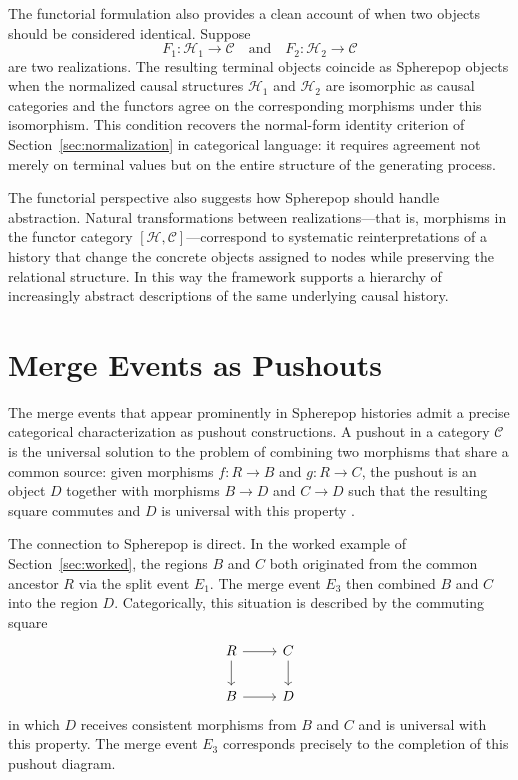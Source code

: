 \documentclass[12pt]{article}
\theoremstyle{plain}
\theoremstyle{definition}
\theoremstyle{remark}
\begin{document}
The functorial formulation also provides a clean account of when two objects
should be considered identical.  Suppose
\[
  F_1 : \mathcal{H}_1 \rightarrow \mathcal{C}
  \quad\text{and}\quad
  F_2 : \mathcal{H}_2 \rightarrow \mathcal{C}
\]
are two realizations.  The resulting terminal objects coincide as Spherepop
objects when the normalized causal structures $\mathcal{H}_1$ and $\mathcal{H}_2$
are isomorphic as causal categories and the functors agree on the corresponding
morphisms under this isomorphism.  This condition recovers the normal-form
identity criterion of Section~\ref{sec:normalization} in categorical language:
it requires agreement not merely on terminal values but on the entire
structure of the generating process.

The functorial perspective also suggests how Spherepop should handle
abstraction.  Natural transformations between realizations---that is, morphisms
in the functor category $[\mathcal{H}, \mathcal{C}]$---correspond to
systematic reinterpretations of a history that change the concrete objects
assigned to nodes while preserving the relational structure.  In this way the
framework supports a hierarchy of increasingly abstract descriptions of the
same underlying causal history.


\section{Merge Events as Pushouts}
\label{sec:pushouts}

The merge events that appear prominently in Spherepop histories admit a precise
categorical characterization as pushout constructions.  A pushout in a category
$\mathcal{C}$ is the universal solution to the problem of combining two
morphisms that share a common source: given morphisms $f : R \rightarrow B$ and
$g : R \rightarrow C$, the pushout is an object $D$ together with morphisms
$B \rightarrow D$ and $C \rightarrow D$ such that the resulting square commutes
and $D$ is universal with this property \citep{MacLane1998}.

The connection to Spherepop is direct.  In the worked example of
Section~\ref{sec:worked}, the regions $B$ and $C$ both originated from the
common ancestor $R$ via the split event $E_1$.  The merge event $E_3$ then
combined $B$ and $C$ into the region $D$.  Categorically, this situation is
described by the commuting square
\[
\begin{tikzcd}
  R \arrow[r] \arrow[d] & C \arrow[d] \\
  B \arrow[r]           & D
\end{tikzcd}
\]
in which $D$ receives consistent morphisms from $B$ and $C$ and is universal
with this property.  The merge event $E_3$ corresponds precisely to the
completion of this pushout diagram.
\end{document}
